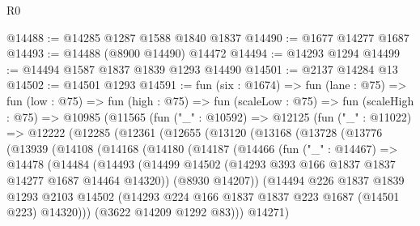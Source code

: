 \begin{lexlean}{R0}
\begin{coremodule}
@14488 := @14285 @1287 @1588 @1840 @1837
@14490 := @1677 @14277 @1687
@14493 := @14488 (@8900 @14490) @14472
@14494 := @14293 @1294
@14499 := @14494 @1587 @1837 @1839 @1293 @14490
@14501 := @2137 @14284 @13
@14502 := @14501 @1293
@14591 := fun (six : @1674) =>
  fun (lane : @75) =>
  fun (low : @75) =>
  fun (high : @75) =>
  fun (scaleLow : @75) =>
  fun (scaleHigh : @75) =>
  @10985
    (@11565
      (fun ("_" : @10592) =>
      @12125
        (fun ("_" : @11022) =>
        @12222
          (@12285
            (@12361
              (@12655
                (@13120
                  (@13168
                    (@13728
                      (@13776
                        (@13939
                          (@14108
                            (@14168
                              (@14180
                                (@14187
                                  (@14466
                                    (fun ("_" : @14467) =>
                                    @14478
                                      (@14484
                                        (@14493
                                          (@14499
                                            @14502
                                            (@14293
                                              @393
                                              @166
                                              @1837
                                              @1837
                                              @14277
                                              @1687
                                              @14464
                                              @14320))
                                          (@8930 @14207))
                                        (@14494
                                          @226
                                          @1837
                                          @1839
                                          @1293
                                          @2103
                                          @14502
                                          (@14293
                                            @224
                                            @166
                                            @1837
                                            @1837
                                            @223
                                            @1687
                                            (@14501 @223)
                                            @14320)))
                                      (@3622 @14209 @1292 @83)))
                                  @14271)

\end{coremodule}
\end{lexlean}
